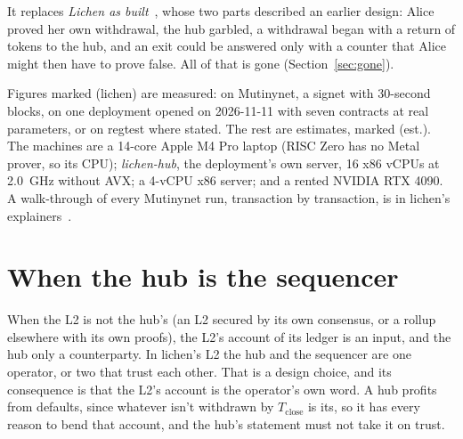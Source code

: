 \documentclass[11pt]{article}
\newcommand{\Tc}{T_{\mathrm{close}}}
\begin{document}
It replaces \emph{Lichen as built}~\cite{lichenbuilt}, whose two parts
described an earlier design: Alice proved her own withdrawal, the hub
garbled, a withdrawal began with a return of tokens to the hub, and an
exit could be answered only with a counter that Alice might then have
to prove false. All of that is gone (Section~\ref{sec:gone}).

Figures marked (lichen) are measured: on Mutinynet, a signet with
30-second blocks, on one deployment opened on 2026-11-11 with seven
contracts at real parameters, or on regtest where stated. The rest are
estimates, marked (est.). The machines are a 14-core Apple M4 Pro
laptop (RISC Zero has no Metal prover, so its CPU); \emph{lichen-hub},
the deployment's own server, 16 x86 vCPUs at 2.0~GHz without AVX; a
4-vCPU x86 server; and a rented NVIDIA RTX 4090.
A walk-through of every Mutinynet run, transaction by transaction, is
in lichen's explainers~\cite{explainers}.

\section{When the hub is the sequencer}
\label{sec:merged}

When the L2 is not the hub's (an L2 secured by its own consensus, or a
rollup elsewhere with its own proofs), the L2's account of its ledger is
an input, and the hub only a counterparty. In lichen's L2 the hub and
the sequencer are one operator, or two that trust each other. That is a
design choice, and its consequence is that the L2's account is the
operator's own word. A hub profits from defaults, since whatever isn't
withdrawn by $\Tc$ is its, so it has every reason to bend that account,
and the hub's statement must not take it on trust.
\end{document}
